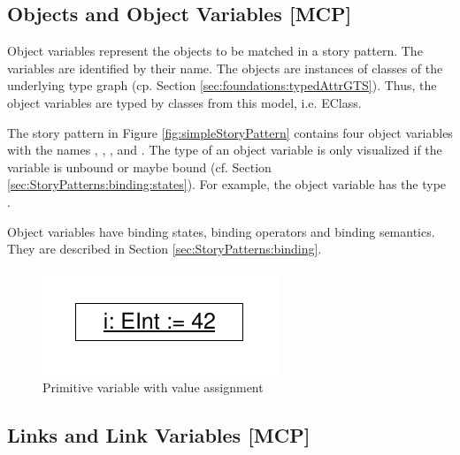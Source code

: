 \subsection{Objects and Object Variables [MCP]}
\label{sec:StoryPatterns:objects}

Object variables represent the objects to be matched in a story pattern.
The variables are identified by their name.
The objects are instances of classes of the underlying type graph (cp.
Section \ref{sec:foundations:typedAttrGTS}). Thus, the object variables are typed by classes from this model, i.e.
EClass.

The story pattern in Figure \ref{fig:simpleStoryPattern} contains four
object variables with the names , , , and
. 
The type of an object variable is only visualized if the
variable is unbound or maybe bound (cf. Section
\ref{sec:StoryPatterns:binding:states}). For example, the object variable  has the type .

Object variables have binding states, binding operators and binding semantics.
They are described in Section  \ref{sec:StoryPatterns:binding}.


\ext %
{

\begin{figure}[htbp]
  \centering
  \includegraphics[scale=0.6]{figures/PrimitiveVariable}
  \caption{Primitive variable with value assignment}
  \label{fig:primitiveVariable}
\end{figure}

}%



\subsection{Links and Link Variables [MCP]}
\label{sec:StoryPatterns:links}

